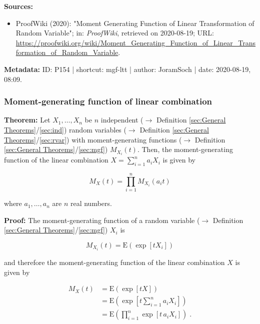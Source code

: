 \documentclass[a4paper,12pt,twoside]{book}
\begin{document}
\vspace{1em}
\textbf{Sources:}
\begin{itemize}
\item ProofWiki (2020): "Moment Generating Function of Linear Transformation of Random Variable"; in: \textit{ProofWiki}, retrieved on 2020-08-19; URL: \url{https://proofwiki.org/wiki/Moment_Generating_Function_of_Linear_Transformation_of_Random_Variable}.
\end{itemize}


\vspace{1em}
\textbf{Metadata:} ID: P154 | shortcut: mgf-ltt | author: JoramSoch | date: 2020-08-19, 08:09.
\vspace{1em}



\subsubsection[\textbf{Moment-generating function of linear combination}]{Moment-generating function of linear combination} \label{sec:mgf-lincomb}
\setcounter{equation}{0}

\textbf{Theorem:} Let $X_1, \ldots, X_n$ be $n$ independent ($\rightarrow$ Definition \ref{sec:General Theorems}/\ref{sec:ind}) random variables ($\rightarrow$ Definition \ref{sec:General Theorems}/\ref{sec:rvar}) with moment-generating functions ($\rightarrow$ Definition \ref{sec:General Theorems}/\ref{sec:mgf}) $M_{X_i}(t)$. Then, the moment-generating function of the linear combination $X = \sum_{i=1}^{n} a_i X_i$ is given by

\begin{equation} \label{eq:mgf-lincomb-mgf-lincomb}
M_X(t) = \prod_{i=1}^{n} M_{X_i}(a_i t)
\end{equation}

where $a_1, \ldots, a_n$ are $n$ real numbers.


\vspace{1em}
\textbf{Proof:} The moment-generating function of a random variable ($\rightarrow$ Definition \ref{sec:General Theorems}/\ref{sec:mgf}) $X_i$ is

\begin{equation} \label{eq:mgf-lincomb-mfg-vect}
M_{X_i}(t) = \mathrm{E} \left( \exp \left[ t X_i \right] \right)
\end{equation}

and therefore the moment-generating function of the linear combination $X$ is given by

\begin{equation} \label{eq:mgf-lincomb-mgf-lincomb-s1}
\begin{split}
M_X(t) &= \mathrm{E} \left( \exp \left[ t X \right] \right) \\
&= \mathrm{E} \left( \exp \left[ t \sum_{i=1}^{n} a_i X_i \right] \right) \\
&= \mathrm{E} \left( \prod_{i=1}^{n} \exp \left[ t \, a_i X_i \right] \right) \; .
\end{split}
\end{equation}
\end{document}
